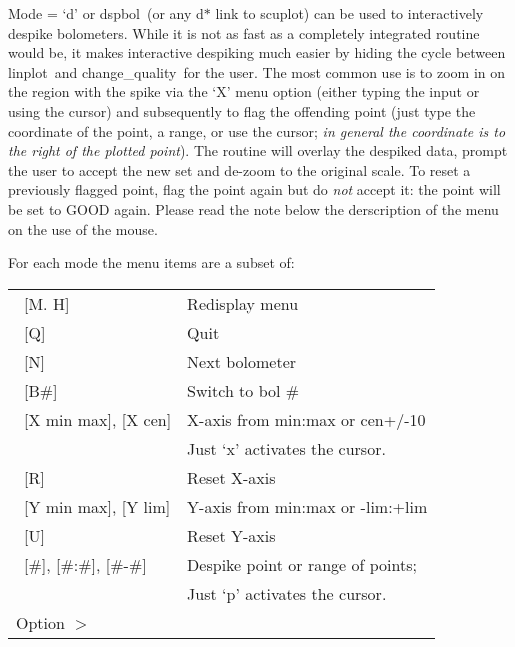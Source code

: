 \documentclass[twoside,11pt]{article}
\newcommand{\task}[1]{{\sf #1}}
\newcommand{\chgqual}{\htmlref{\task{change\_quality}}{CHANGE_QUALITY}}
\newcommand{\dspbol}{\htmlref{\task{dspbol}}{DSPBOL}}
\newcommand{\linplot}{\xref{\task{linplot}}{sun95}{LINPLOT}}
\newcommand{\htmlref}[2]{#1}
\newcommand{\xref}[3]{#1}
\begin{document}
{{      Mode = `d' or \dspbol\ (or any d$*$ link to scuplot) can be used to
      interactively despike bolometers. While it is not as fast as a
      completely integrated routine would be, it makes interactive
      despiking much easier by hiding the cycle between \linplot\ and
      \chgqual\ for the user. The most common use is to zoom in on
      the region with the spike via the `X' menu option (either typing
      the input or using the cursor) and subsequently to flag the
      offending point (just type the coordinate of the point, a range, or
      use the cursor; \textit{in general the coordinate is to the right of the
      plotted point}). The routine will overlay the despiked data, prompt
      the user to accept the new set and de-zoom to the original
      scale. To reset a previously flagged point, flag the point again
      but do \textit{not} accept it: the point will be set to GOOD again.  
      Please read the note below the derscription of the menu on the use of the
      mouse.

      For each mode the menu items are a subset of:

\begin{center}
\begin{tabular}{ll}	
\        [M. H]                & Redisplay menu\\   
\        [Q]                   &Quit\\
\        [N]                   &Next bolometer\\
\        [B\#]                  &Switch to bol \#\\
\        [X min max], [X cen]  &X-axis from min:max or cen+/-10\\
\                              &Just `x' activates the cursor.\\
\        [R]                   &Reset X-axis\\
\        [Y min max], [Y lim]  &Y-axis from min:max or -lim:+lim\\
\        [U]                   &Reset Y-axis\\
\        [\#], [\#:\#], [\#-\#]     &Despike point or range of points;\\
                              &Just `p' activates the cursor.\\

        Option $>$ & \\
\end{tabular}
\end{center}

}}
\end{document}
